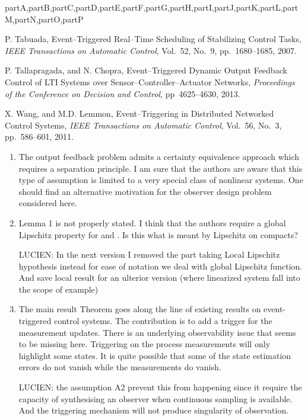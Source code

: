 \documentclass[letterpaper, 10 pt, conference]{ieeeconf}
\def\compile{partA,partB,partC,partD,partE,partF,partG,partH,partI,partJ,partK,partL,partM,partN,partO,partP}
\newenvironment{partP}[1][]{}{}
\begin{document}
\begin{xcomment}{\compile}
\begin{partP}
\begin{thebibliography}{99}
 P. Tabuada, Event--Triggered Real--Time Scheduling of Stabilizing Control Tasks, {\sl IEEE Transactions on Automatic Control}, Vol.~52, No.~9, pp.~1680--1685, 2007.

 P. Tallapragada, and N. Chopra, Event--Triggered Dynamic Output Feedback Control of LTI Systems over Sensor--Controller--Actuator Networks, {\sl  Proceedings of the  Conference on Decision and Control}, pp~4625--4630, 2013.

 X. Wang, and M.D. Lemmon, Event--Triggering in Distributed Networked Control Systems, {\sl IEEE Transactions on Automatic Control}, Vol.~56, No.~3, pp.~586--601, 2011.

\end{thebibliography}


\end{partP}
\begin{partQ}



\begin{enumerate}
\item The output feedback problem admits a certainty equivalence approach which requires a separation principle. I am sure that the authors are aware that this type of assumption is limited to a very special class of nonlinear systems. One should find an alternative motivation for the observer design problem considered here. 

\item Lemma 1 is not properly stated. I think that the authors require a global Lipschitz property for  and . Is this what is meant by Lipschitz on compacts?

LUCIEN: In the next version I removed the part taking Local Lipschitz hypothesis instead for ease of notation we deal with global Lipschitz function. And save local result for an ulterior version (where linearized system fall into the scope of example) 


\item The main result Theorem goes along the line of existing results on event-triggered control systems. The contribution is to add a trigger for the measurement updates.  There is an underlying observability issue that seems to be missing here. Triggering on the process measurements will only highlight some states. It is quite possible that some of the state estimation errors do not vanish while the measurements do vanish.  

LUCIEN: the assumption A2 prevent this from happening since it require the capacity of synthesising an observer when continuous sampling is available. And the triggering mechanism will not produce singularity of observation.



\end{enumerate}
\end{partQ}
\end{xcomment}
\end{document}

